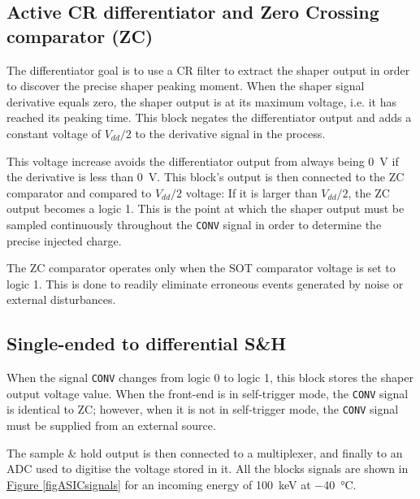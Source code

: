 
\subsection{Active CR differentiator and Zero Crossing comparator (ZC)}
\label{zeroCrossing}
The differentiator goal is to use a CR filter to extract the shaper output in order to discover the precise shaper peaking moment. When the shaper signal derivative equals zero, the shaper output is at its maximum voltage, i.e. it has reached its peaking time. This block negates the differentiator output and adds a constant voltage of $V_{dd}/2$ to the derivative signal in the process.

This voltage increase avoids the differentiator output from always being \SI{0}{V} if the derivative is less than \SI{0}{V}. This block's output is then connected to the ZC comparator and compared to $V_{dd}/2$ voltage: If it is larger than $V_{dd}/2$, the ZC output becomes a logic 1. This is the point at which the shaper output must be sampled continuously throughout the \texttt{CONV} signal in order to determine the precise injected charge.

\par
The ZC comparator operates only when the SOT comparator voltage is set to logic 1. This is done to readily eliminate erroneous events generated by noise or external disturbances.


\subsection{Single-ended to differential S\&H}
When the signal \texttt{CONV} changes from logic 0 to logic 1, this block stores the shaper output voltage value. When the front-end is in self-trigger mode, the \texttt{CONV} signal is identical to ZC; however, when it is not in self-trigger mode, the \texttt{CONV} signal must be supplied from an external source.

\par
The sample \& hold output is then connected to a multiplexer, and finally to an ADC used to digitise the voltage stored in it. All the blocks signals are shown in \hyperref[figASICsignals]{Figure \ref{figASICsignals}} for an incoming energy of \SI{100}{\kilo\electronvolt} at \SI{-40}{\celsius}.

